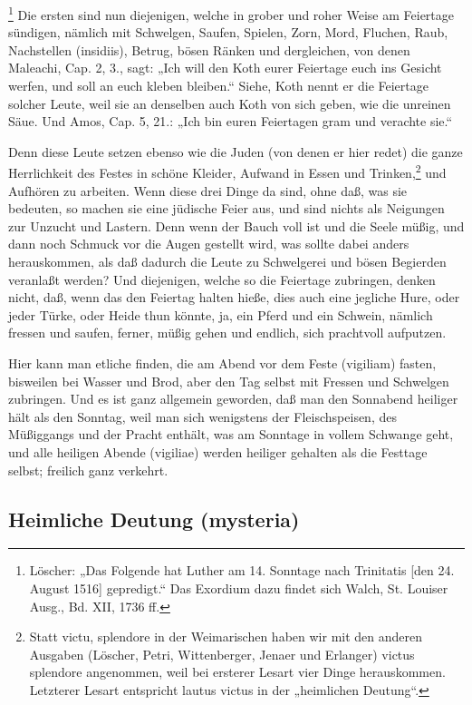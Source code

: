 \footnote{Löscher: „Das Folgende hat Luther am 14. Sonntage nach Trinitatis [den 24. August 1516] gepredigt.“ Das Exordium dazu findet sich Walch, St. Louiser Ausg., Bd. XII, 1736 ff.} Die ersten sind nun diejenigen, welche in grober und roher Weise am Feiertage sündigen, nämlich mit Schwelgen, Saufen, Spielen, Zorn, Mord, Fluchen, Raub, Nachstellen (insidiis), Betrug, bösen Ränken und dergleichen, von denen Maleachi, Cap. 2, 3., sagt: „Ich will den Koth eurer Feiertage euch ins Gesicht werfen, und soll an euch kleben bleiben.“ Siehe, Koth nennt er die Feiertage solcher Leute, weil sie an denselben auch Koth von sich geben, wie die unreinen Säue. Und Amos, Cap. 5, 21.: „Ich bin euren Feiertagen gram und verachte sie.“

Denn diese Leute setzen ebenso wie die Juden (von denen er hier redet) die ganze Herrlichkeit des Festes in schöne Kleider, Aufwand in Essen und Trinken,\footnote{Statt victu, splendore in der Weimarischen haben wir mit den anderen Ausgaben (Löscher, Petri, Wittenberger, Jenaer und Erlanger) victus splendore angenommen, weil bei ersterer Lesart vier Dinge herauskommen. Letzterer Lesart entspricht lautus victus in der „heimlichen Deutung“.} und Aufhören zu arbeiten. Wenn diese drei Dinge da sind, ohne daß, was sie bedeuten, so machen sie eine jüdische Feier aus, und sind nichts als Neigungen zur Unzucht und Lastern. Denn wenn der Bauch voll ist und die Seele müßig, und dann noch Schmuck vor die Augen gestellt wird, was sollte dabei anders herauskommen, als daß dadurch die Leute zu Schwelgerei und bösen Begierden veranlaßt werden? Und diejenigen, welche so die Feiertage zubringen, denken nicht, daß, wenn das den Feiertag halten hieße, dies auch eine jegliche Hure, oder jeder Türke, oder Heide thun könnte, ja, ein Pferd und ein Schwein, nämlich fressen und saufen, ferner, müßig gehen und endlich, sich prachtvoll aufputzen.

Hier kann man etliche finden, die am Abend vor dem Feste (vigiliam) fasten, bisweilen bei Wasser und Brod, aber den Tag selbst mit Fressen und Schwelgen zubringen. Und es ist ganz allgemein geworden, daß man den Sonnabend heiliger hält als den Sonntag, weil man sich wenigstens der Fleischspeisen, des Müßiggangs und der Pracht enthält, was am Sonntage in vollem Schwange geht, und alle heiligen Abende (vigiliae) werden heiliger gehalten als die Festtage selbst; freilich ganz verkehrt.

\subsection{Heimliche Deutung (mysteria)}

